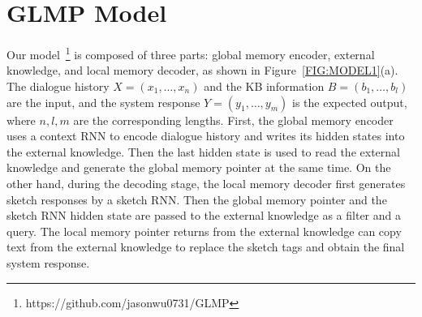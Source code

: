 \documentclass{article} \usepackage{iclr2019_conference,times}
\begin{document}
\begin{table}[t]
\setlength{\abovecaptionskip}{-1pt} 
\caption{An in-car assistant example on the navigation domain. The left part is the KB information and the right part is the conversation between a driver and our system.}
\label{TB:EXAMPLE}
\begin{center}
\end{center}
\vspace{-1.0\baselineskip}
\end{table}

\section{GLMP Model}
Our model~\footnote{https://github.com/jasonwu0731/GLMP} is composed of three parts: global memory encoder, external knowledge, and local memory decoder, as shown in Figure~\ref{FIG:MODEL1}(a). The dialogue history $X = (x_1,\dots,x_n)$ and the KB information $B = (b_1,\dots,b_l)$ are the input, and the system response $Y=(y_1,\dots,y_m)$ is the expected output, where $n, l, m$ are the corresponding lengths. First, the global memory encoder uses a context RNN to encode dialogue history and writes its hidden states into the external knowledge. Then the last hidden state is used to read the external knowledge and generate the global memory pointer at the same time. On the other hand, during the decoding stage, the local memory decoder first generates sketch responses by a sketch RNN. Then the global memory pointer and the sketch RNN hidden state are passed to the external knowledge as a filter and a query. The local memory pointer returns from the external knowledge can copy text from the external knowledge to replace the sketch tags and obtain the final system response.
\end{document}
